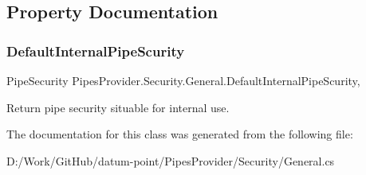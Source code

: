 \subsection{Property Documentation}
\mbox{\label{class_pipes_provider_1_1_security_1_1_general_a49b6c46c031ae200885fcababfdb32c3}} 
\subsubsection{\texorpdfstring{Default\+Internal\+Pipe\+Scurity}{DefaultInternalPipeScurity}}
{\footnotesize\ttfamily Pipe\+Security Pipes\+Provider.\+Security.\+General.\+Default\+Internal\+Pipe\+Scurity\hspace{0.3cm}{\ttfamily [static]}, {\ttfamily [get]}}



Return pipe security situable for internal use. 



The documentation for this class was generated from the following file\+:\begin{DoxyCompactItemize}
\item 
D\+:/\+Work/\+Git\+Hub/datum-\/point/\+Pipes\+Provider/\+Security/General.\+cs\end{DoxyCompactItemize}
